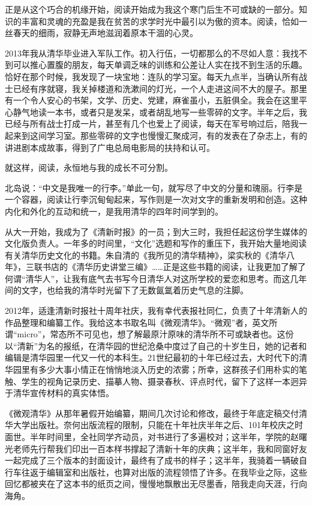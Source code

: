 \documentclass[openany,scheme = chinese, linespread = 1.5]{ctexbook}
\begin{document}
正是从这个巧合的机缘开始，阅读开始成为我这个寒门后生不可或缺的一部分。知识的丰富和灵魂的充盈是我在贫苦的求学时光中最引以为傲的资本。阅读，恰如一丝春天的细雨，寂静无声地滋润着原本干涸的心灵。

2013年我从清华毕业进入军队工作。初入行伍，一切都那么的不尽如人意：我找不到可以推心置腹的朋友，每天单调乏味的训练和公差让人实在找不到生活的乐趣。恰好在那个时候，我发现了一块宝地：连队的学习室。每天九点半，当确认所有战士已经有序就寝，我关掉楼道和洗漱间的灯光，一个人走进这间不大的屋子。那里有一个令人安心的书架，文学、历史、党建，麻雀虽小，五脏俱全。我会在这里平心静气地读一本书，或者只是发呆，或者胡乱地写一些零碎的文字。半年之后，我已经与所有战士打成一片，甚至有几个也爱上了阅读，每天在军号响过后，陪我一起来到这间学习室。那些零碎的文字也慢慢汇聚成河，有的发表在了杂志上，有的讲进剧本成故事，得到了广电总局电影局的扶持和认可。

就这样，阅读，永恒地与我的成长不可分割。

北岛说：“中文是我唯一的行李。”单此一句，就写尽了中文的分量和瑰丽。行李是一个容器，阅读让行李沉甸甸起来，写作则是一次对文字的重新发明和创造。这种内化和外化的互动和统一，是我用清华的四年时间学到的。

从大一开始，我成为了《清新时报》的一员；到大三时，我担任起这份学生媒体的文化版负责人。一年多的时间里，“文化”选题和写作的重压下，我开始大量地阅读有关清华历史文化的书籍。朱自清的《我所见的清华精神》，梁实秋的《清华八年》，三联书店的《清华历史讲堂三编》……正是这些书籍的阅读，让我更加了解了何谓“清华人”，让我有底气去书写今日清华人对这所学校的爱恋和思考。而这几年间的文字，也给我的清华时光留下了无数氤氲着历史气息的注脚。

2012年，适逢清新时报社十周年社庆，我有幸代表报社同仁，负责了十年清新人的作品整理和编纂工作。我给这本书取名叫《微观清华》。“微观”者，英文所谓“micro”，常态所不可见也，想了解最原汁原味的清华所不可或缺者也。这份以“清新”为名的报纸，在清华园的世纪沧桑中度过了自己的十岁生日，她的记者和编辑是清华园里一代又一代的本科生。21世纪最初的十年已经过去，大时代下的清华园里有多少大事小情正在悄悄地淡入历史的浓雾；所幸，这群孩子们用朴实的笔触、学生的视角记录历史、描摹人物、摄录春秋、评点时代，留下了这样一本迥异于清华宣传材料的真实体悟。

《微观清华》从那年暑假开始编纂，期间几次讨论和修改，最终于年底定稿交付清华大学出版社。奈何出版流程的限制，只能在十年社庆半年之后、101年校庆之时面世。半年时间里，全社同学齐动员，对书进行了多遍校对；这半年，学院的赵曙光老师先行帮我们印出一百本样书撑起了清新十年的庆典；这半年，我和同窗好友一起完成了三个版本的封面设计，最终有了成书的样子；这半年，我骑着一辆破自行车往返于编辑室和出版社，也算对出版的流程领悟了许多。在我毕业之际，这些回忆都被夹在了这本书的纸页之间，慢慢地飘散出无尽墨香，陪我走向天涯，行向海角。
\end{document}
